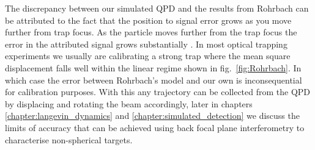 The discrepancy between our simulated QPD and the results 
from Rohrbach can be attributed to the fact that the position 
to signal error grows as you move further from trap focus. 
As the particle moves further from the trap focus the error 
in the attributed signal grows substantially \cite{Rohrbach2002}.
In most optical trapping experiments we usually are calibrating 
a strong trap where the mean square displacement falls well within 
the linear regime shown in fig.~\ref{fig:Rohrbach}. In which case 
the error between Rohrbach's model and our own is inconsequential 
for calibration purposes. With this any trajectory can be collected 
from the QPD by displacing and rotating the beam accordingly, 
later in chapters \ref{chapter:langevin_dynamics} and \ref{chapter:simulated_detection} we discuss the limits of 
accuracy that can be achieved using back focal plane interferometry 
to characterise non-spherical targets.

